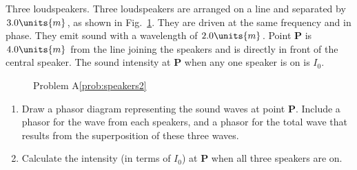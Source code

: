 \begin{aproblem}{Three loudspeakers.}
  Three loudspeakers are arranged on a line and separated by
  $3.0\units{m}$, as shown in Fig.~\ref{fig:speakers2}. They are
  driven at the same frequency and in phase.  They emit sound with a
  wavelength of $2.0\units{m}$.  Point {\bf P} is $4.0\units{m}$ from
  the line joining the speakers and is directly in front of the
  central speaker.  The sound intensity at {\bf P} when any one
  speaker is on is $I_0$.
  \label{prob:speakers2} 
  \begin{figure}[h]
    \begin{center} 
      \caption{Problem A\ref{prob:speakers2}}
      \label{fig:speakers2}
    \end{center}
  \end{figure}
  \begin{enumerate}
  \item Draw a phasor diagram representing the sound waves at point
    {\bf P}.  Include a phasor for the wave from each speakers, and a
    phasor for the total wave that results from the superposition of
    these three waves.
  \item Calculate the intensity (in terms of $I_0$) at {\bf P} when
    all three speakers are on.
  \end{enumerate}
\end{aproblem}


